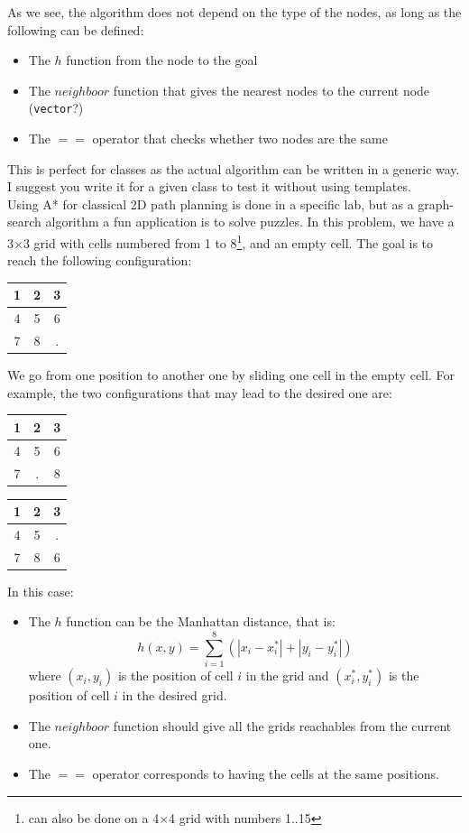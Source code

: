 \documentclass{ecnreport}
\begin{document}
As we see, the algorithm does not depend on the type of the nodes, as long as the following can be defined:
\begin{itemize}
 \item The $h$ function from the node to the goal
 \item The $neighboor$ function that gives the nearest nodes to the current node (\texttt{vector}?)
 \item The $==$ operator that checks whether two nodes are the same
\end{itemize}

This is perfect for classes as the actual algorithm can be written in a generic way. I suggest you write it for a given class to test it without using templates.\\

Using A* for classical 2D path planning is done in a specific lab, but as a graph-search algorithm a fun application is to solve puzzles.
In this problem, we have a 3$\times$3 grid with cells numbered from 1 to 8\footnote{can also be done on a 4$\times$4 grid with numbers 1..15}, and an empty cell.
The goal is to reach the following configuration:
\begin{center}
 \begin{tabular}{|c|c|c|}
 \hline  
 1 &2&3\\\hline
 4 &5&6\\\hline
 7&8&.\\\hline
 \end{tabular}
\end{center}
We go from one position to another one by sliding one cell in the empty cell. For example, the two configurations that may lead to the desired one are:
\begin{center}
 
 \begin{tabular}{|c|c|c|}
 \hline  
 1 &2&3\\\hline
 4 &5&6\\\hline
 7&.&8\\\hline
 \end{tabular}\quad\quad\quad
 \begin{tabular}{|c|c|c|}
 \hline  
 1 &2&3\\\hline
 4 &5&.\\\hline
 7&8&6\\\hline
 \end{tabular}
\end{center}

In this case:
\begin{itemize}
 \item The $h$ function can be the Manhattan distance, that is:
 \begin{equation*}
  h(x,y) = \sum_{i=1}^8(|x_i - x_i^*| + |y_i - y_i^*|)
 \end{equation*}where $(x_i,y_i)$ is the position of cell $i$ in the grid and $(x_i^*,y_i^*)$ is the position
 of cell $i$ in the desired grid.
 \item The $neighboor$ function should give all the grids reachables from the current one.
 \item The $==$ operator corresponds to having the cells at the same positions.
\end{itemize}
\end{document}
